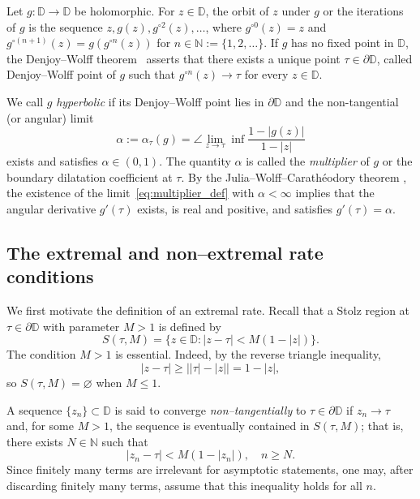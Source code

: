 \documentclass[10pt,a4paper]{amsart}
\numberwithin{equation}{section}
\begin{document}
Let $g:\mathbb{D}\to\mathbb{D}$ be holomorphic.
For $z\in\mathbb{D}$, the orbit of $z$ under $g$ or the iterations of $g$
is the sequence $z, g(z), g^{\circ 2}(z),\ldots$,
where $g^{\circ 0}(z)=z$ and
$g^{\circ(n+1)}(z)=g(g^{\circ n}(z))$ for $n\in\mathbb{N}:=\{1,2,\ldots\}$.
If $g$ has no fixed point in $\mathbb{D}$, the Denjoy--Wolff
theorem~\cite[Theorem~1.8.4]{bracci2020} asserts that there
exists a unique point $\tau\in\partial\mathbb{D}$,
called Denjoy--Wolff point of $g$ such that
$g^{\circ n}(z)\to\tau$ for every $z\in\mathbb{D}$.

We call $g$ \textit{hyperbolic} if its Denjoy--Wolff point
lies in $\partial\mathbb{D}$ and the non-tangential (or angular) limit
\begin{equation}
\label{eq:multiplier_def}
\alpha:=\alpha_\tau(g)
=\angle\lim_{z\to\tau}\inf\frac{1-|g(z)|}{1-|z|}
\end{equation}
exists and satisfies $\alpha\in(0,1)$.
The quantity $\alpha$ is called the \textit{multiplier} of
$g$ or the boundary dilatation coefficient
at $\tau$.
By the Julia--Wolff--Carath\'eodory theorem
\cite[Theorem~1.7.3]{bracci2020}, the existence of the
limit~\eqref{eq:multiplier_def} with $\alpha<\infty$
implies that the angular derivative $g'(\tau)$ exists, is
real and positive, and satisfies $g'(\tau)=\alpha$.



\subsection{The extremal and non--extremal rate conditions}
\label{subsec:extremal_def}

We first motivate the definition of an extremal rate. Recall that a
Stolz region at $\tau\in\partial\mathbb{D}$ with parameter $M>1$ is
defined by
\begin{equation*}
S(\tau,M)
=
\{z\in\mathbb{D}: |z-\tau|<M(1-|z|)\}.
\end{equation*}
The condition $M>1$ is essential. Indeed, by the reverse triangle
inequality,
\begin{equation*}
|z-\tau|\geq \bigl||\tau|-|z|\bigr|=1-|z|,
\end{equation*}
so $S(\tau,M)=\varnothing$ when $M\leq1$.

A sequence $\{z_n\}\subset\mathbb{D}$ is said to converge
\emph{non--tangentially} to $\tau\in\partial\mathbb{D}$ if
$z_n\to\tau$ and, for some $M>1$, the sequence is eventually contained
in $S(\tau,M)$; that is, there exists $N\in\mathbb{N}$ such that
\begin{equation*}
|z_n-\tau|<M(1-|z_n|),\quad n\geq N.
\end{equation*}
Since finitely many terms are irrelevant for asymptotic statements,
one may, after discarding finitely many terms, assume that this
inequality holds for all $n$.
\end{document}
